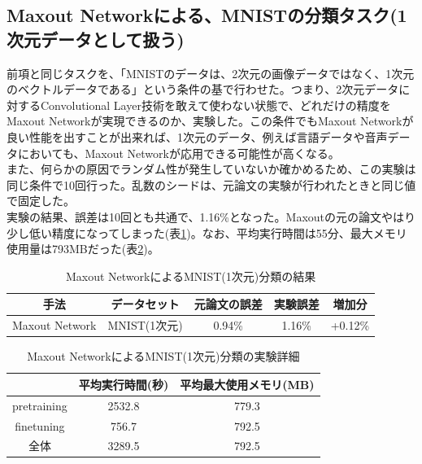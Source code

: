 \subsection{Maxout Networkによる、MNISTの分類タスク(1次元データとして扱う)}
前項と同じタスクを、「MNISTのデータは、2次元の画像データではなく、1次元のベクトルデータである」という条件の基で行わせた。つまり、2次元データに対するConvolutional Layer技術を敢えて使わない状態で、どれだけの精度をMaxout Networkが実現できるのか、実験した。この条件でもMaxout Networkが良い性能を出すことが出来れば、1次元のデータ、例えば言語データや音声データにおいても、Maxout Networkが応用できる可能性が高くなる。\\
また、何らかの原因でランダム性が発生していないか確かめるため、この実験は同じ条件で10回行った。乱数のシードは、元論文の実験が行われたときと同じ値で固定した。\\
実験の結果、誤差は10回とも共通で、1.16\%となった。Maxoutの元の論文やはり少し低い精度になってしまった(表\ref{c5_maxout_mnist1_result})。なお、平均実行時間は55分、最大メモリ使用量は793MBだった(表\ref{c5_maxout_mnist1_stat})。\\
\begin{table}[tdp]
\caption{Maxout NetworkによるMNIST(1次元)分類の結果}
\begin{center}
\begin{tabular}{|c|c|c|c|c|}\hline
手法 & データセット & 元論文の誤差 & 実験誤差 & 増加分\\ \hline
Maxout Network & MNIST(1次元) & 0.94\% & 1.16\% & +0.12\% \\ \hline
\end{tabular}
\end{center}
\label{c5_maxout_mnist1_result}
\end{table}%

\begin{table}[tdp]
\caption{Maxout NetworkによるMNIST(1次元)分類の実験詳細}
\begin{center}
\begin{tabular}{|c|c|c|}\hline
 & 平均実行時間(秒) & 平均最大使用メモリ(MB) \\ \hline
pretraining & 2532.8 & 779.3 \\ \hline
finetuning & 756.7 & 792.5 \\ \hline
全体 & 3289.5 & 792.5 \\ \hline
\end{tabular}
\end{center}
\label{c5_maxout_mnist1_stat}
\end{table}%


